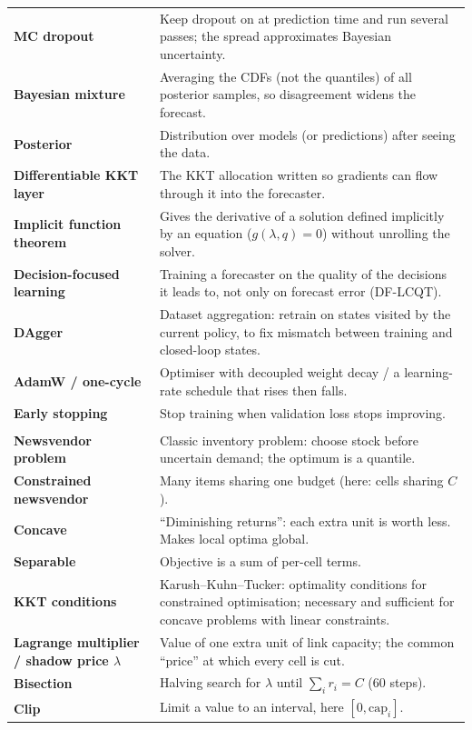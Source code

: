 \documentclass[11pt,a4paper]{article}
\begin{document}
\begin{longtable}{>{\raggedright\arraybackslash\bfseries}p{3.6cm}>{\raggedright\arraybackslash}p{12.2cm}}
MC dropout & Keep dropout on at prediction time and run several passes; the spread approximates Bayesian uncertainty. \\
Bayesian mixture & Averaging the CDFs (not the quantiles) of all posterior samples, so disagreement widens the forecast. \\
Posterior & Distribution over models (or predictions) after seeing the data. \\
Differentiable KKT layer & The KKT allocation written so gradients can flow through it into the forecaster. \\
Implicit function theorem & Gives the derivative of a solution defined implicitly by an equation ($g(\lambda,q) = 0$) without unrolling the solver. \\
Decision-focused learning & Training a forecaster on the quality of the decisions it leads to, not only on forecast error (DF-LCQT). \\
DAgger & Dataset aggregation: retrain on states visited by the current policy, to fix mismatch between training and closed-loop states. \\
AdamW / one-cycle & Optimiser with decoupled weight decay / a learning-rate schedule that rises then falls. \\
Early stopping & Stop training when validation loss stops improving. \\
\multicolumn{2}{l}{\color{iitblue}\normalsize\textbf{Optimisation, control and theory}}\\
Newsvendor problem & Classic inventory problem: choose stock before uncertain demand; the optimum is a quantile. \\
Constrained newsvendor & Many items sharing one budget (here: cells sharing $C$). \\
Concave & ``Diminishing returns'': each extra unit is worth less. Makes local optima global. \\
Separable & Objective is a sum of per-cell terms. \\
KKT conditions & Karush--Kuhn--Tucker: optimality conditions for constrained optimisation; necessary and sufficient for concave problems with linear constraints. \\
Lagrange multiplier / shadow price $\lambda$ & Value of one extra unit of link capacity; the common ``price'' at which every cell is cut. \\
Bisection & Halving search for $\lambda$ until $\sum_i r_i = C$ (60 steps). \\
Clip & Limit a value to an interval, here $[0, \mathrm{cap}_i]$. \\

\end{longtable}
\end{document}
